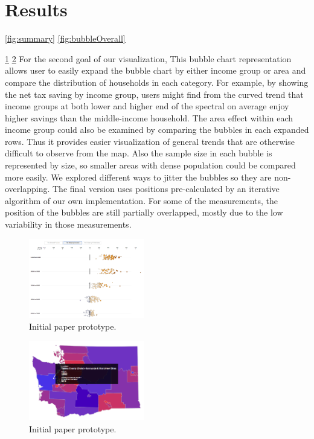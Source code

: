 \documentclass{sigchi}
\begin{document}
\section{Results}
\ref{fig:summary}
\ref{fig:bubbleOverall}

\ref{fig:bubbleIncome}
\ref{fig:mapTooltip}
For the second goal of our visualization,  This bubble chart representation allows user to easily expand the bubble chart by either income group or area and compare the distribution of households in each category. For example, by showing the net tax saving by income group, users might find from the curved trend that income groups at both lower and higher end of the spectral on average enjoy higher savings than the middle-income household. The area effect within each income group could also be examined by comparing the bubbles in each expanded rows. Thus it provides easier visualization of general trends that are otherwise difficult to observe from the map. Also the sample size in each bubble is represented by size, so smaller areas with dense population could be compared more easily. We explored different ways to jitter the bubbles so they are non-overlapping. The final version uses positions pre-calculated by an iterative algorithm of our own implementation. For some of the measurements, the position of the bubbles are still partially overlapped, mostly due to the low variability in those measurements.  





\begin{figure}
\centering
\includegraphics[width=0.45\textwidth]{bubbleIncome}
\caption{Initial paper prototype.}
\label{fig:bubbleIncome}
\end{figure}

\begin{figure}
\centering
\includegraphics[width=0.45\textwidth]{mapTooltip}
\caption{Initial paper prototype.}
\label{fig:mapTooltip}
\end{figure}
\end{document}
